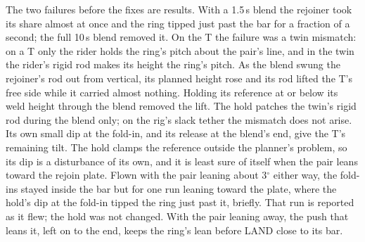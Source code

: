 
The two failures before the fixes are results. With a 1.5\,s blend the rejoiner took its share almost at once and the
ring tipped just past the bar for a fraction of a second; the full 10\,s blend removed it. On the T the failure was a
twin mismatch: on a T only the rider holds the ring's pitch about the pair's line, and in the twin the rider's rigid
rod makes its height the ring's pitch. As the blend swung the rejoiner's rod out from vertical, its planned height
rose and its rod lifted the T's free side while it carried almost nothing. Holding its reference at or below its weld
height through the blend removed the lift. The hold patches the twin's rigid rod during the blend only; on the rig's
slack tether the mismatch does not arise. Its own small dip at the fold-in, and its release at the blend's end, give
the T's remaining tilt. The hold clamps the reference outside the planner's problem, so its dip is a disturbance of its
own, and it is least sure of itself when the pair leans toward the rejoin plate. Flown with the pair leaning about
3$^\circ$ either way, the fold-ins stayed inside the bar but for one run leaning toward the plate, where the hold's dip
at the fold-in tipped the ring just past it, briefly. That run is reported as it flew; the hold was not changed. With
the pair leaning away, the push that leans it, left on to the end, keeps the ring's lean before LAND close to its bar.

